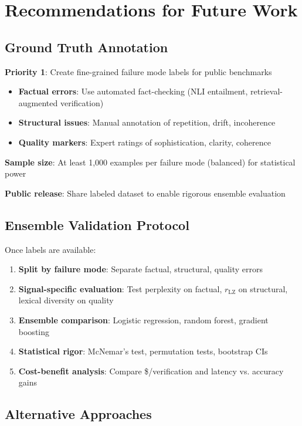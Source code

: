 \documentclass[11pt]{article}
\begin{document}
\section{Recommendations for Future Work}
\label{sec:future}

\subsection{Ground Truth Annotation}

\textbf{Priority 1}: Create fine-grained failure mode labels for public benchmarks
\begin{itemize}
\item \textbf{Factual errors}: Use automated fact-checking (NLI entailment, retrieval-augmented verification)
\item \textbf{Structural issues}: Manual annotation of repetition, drift, incoherence
\item \textbf{Quality markers}: Expert ratings of sophistication, clarity, coherence
\end{itemize}

\textbf{Sample size}: At least 1,000 examples per failure mode (balanced) for statistical power

\textbf{Public release}: Share labeled dataset to enable rigorous ensemble evaluation

\subsection{Ensemble Validation Protocol}

Once labels are available:
\begin{enumerate}
\item \textbf{Split by failure mode}: Separate factual, structural, quality errors
\item \textbf{Signal-specific evaluation}: Test perplexity on factual, $r_{\text{LZ}}$ on structural, lexical diversity on quality
\item \textbf{Ensemble comparison}: Logistic regression, random forest, gradient boosting
\item \textbf{Statistical rigor}: McNemar's test, permutation tests, bootstrap CIs
\item \textbf{Cost-benefit analysis}: Compare \$/verification and latency vs. accuracy gains
\end{enumerate}

\subsection{Alternative Approaches}
\end{document}
